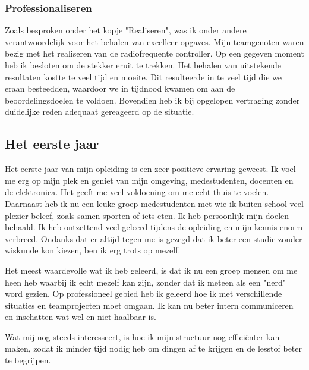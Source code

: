 \subsubsection{Professionaliseren}
Zoals besproken onder het kopje "Realiseren", was ik onder andere verantwoordelijk voor het behalen van excelleer opgaves. Mijn teamgenoten waren bezig met het realiseren van de radiofrequente controller. Op een gegeven moment heb ik besloten om de stekker eruit te trekken. Het behalen van uitstekende resultaten kostte te veel tijd en moeite. Dit resulteerde in te veel tijd die we eraan besteedden, waardoor we in tijdnood kwamen om aan de beoordelingsdoelen te voldoen. Bovendien heb ik bij opgelopen vertraging zonder duidelijke reden adequaat gereageerd op de situatie.
\subsection{Het eerste jaar}
Het eerste jaar van mijn opleiding is een zeer positieve ervaring geweest. Ik voel me erg op mijn plek en geniet van mijn omgeving, medestudenten, docenten en de elektronica. Het geeft me veel voldoening om me echt thuis te voelen. Daarnaast heb ik nu een leuke groep medestudenten met wie ik buiten school veel plezier beleef, zoals samen sporten of iets eten. Ik heb persoonlijk mijn doelen behaald. Ik heb ontzettend veel geleerd tijdens de opleiding en mijn kennis enorm verbreed. Ondanks dat er altijd tegen me is gezegd dat ik beter een studie zonder wiskunde kon kiezen, ben ik erg trots op mezelf.

Het meest waardevolle wat ik heb geleerd, is dat ik nu een groep mensen om me heen heb waarbij ik echt mezelf kan zijn, zonder dat ik meteen als een "nerd" word gezien. Op professioneel gebied heb ik geleerd hoe ik met verschillende situaties en teamprojecten moet omgaan. Ik kan nu beter intern communiceren en inschatten wat wel en niet haalbaar is.

Wat mij nog steeds interesseert, is hoe ik mijn structuur nog efficiënter kan maken, zodat ik minder tijd nodig heb om dingen af te krijgen en de lesstof beter te begrijpen.
